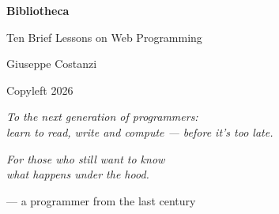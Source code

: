 \begin{titlepage}
\centering
\vspace*{5cm}
{\Huge\bfseries Bibliotheca\par}
\vspace{0.5cm}
{\Large Ten Brief Lessons on Web Programming\par}
\vfill
{\normalsize Giuseppe Costanzi\par}
{\small Copyleft 2026\par}
\vspace{2cm}
{\itshape\small To the next generation of programmers:\\
learn to read, write and compute --- before it's too late.\par}
\vspace{0.3cm}
{\itshape\small For those who still want to know\\
what happens under the hood.\par}
\vspace{0.5cm}
{\small --- a programmer from the last century\par}
\end{titlepage}
